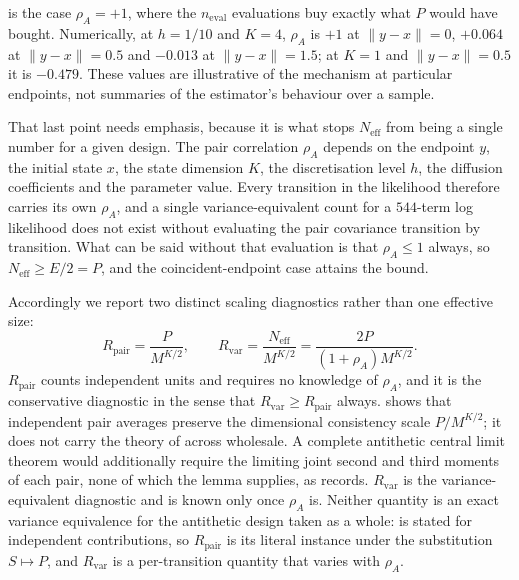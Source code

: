 \documentclass[11pt]{article}
\theoremstyle{definition}
\newcommand{\neval}{n_{\mathrm{eval}}}
\begin{document}
 is the case $\rho_A=+1$, where the $\neval$ evaluations buy exactly what $P$ would have bought. Numerically, at $h=1/10$ and $K=4$, $\rho_A$ is $+1$ at $\lVert y-x\rVert=0$, $+0.064$ at $\lVert y-x\rVert=0.5$ and $-0.013$ at $\lVert y-x\rVert=1.5$; at $K=1$ and $\lVert y-x\rVert=0.5$ it is $-0.479$. These values are illustrative of the mechanism at particular endpoints, not summaries of the estimator's behaviour over a sample.

That last point needs emphasis, because it is what stops $N_{\mathrm{eff}}$ from being a single number for a given design. The pair correlation $\rho_A$ depends on the endpoint $y$, the initial state $x$, the state dimension $K$, the discretisation level $h$, the diffusion coefficients and the parameter value. Every transition in the likelihood therefore carries its own $\rho_A$, and a single variance-equivalent count for a $544$-term log likelihood does not exist without evaluating the pair covariance transition by transition. What can be said without that evaluation is that $\rho_A\le1$ always, so $N_{\mathrm{eff}}\ge E/2=P$, and the coincident-endpoint case attains the bound.

Accordingly we report two distinct scaling diagnostics rather than one effective size:
\begin{equation}\label{eq:two_diagnostics}
R_{\mathrm{pair}}=\frac{P}{M^{K/2}},
\qquad
R_{\mathrm{var}}=\frac{N_{\mathrm{eff}}}{M^{K/2}}=\frac{2P}{(1+\rho_A)M^{K/2}} .
\end{equation}
$R_{\mathrm{pair}}$ counts independent units and requires no knowledge of $\rho_A$, and it is the conservative diagnostic in the sense that $R_{\mathrm{var}}\ge R_{\mathrm{pair}}$ always.  shows that independent pair averages preserve the dimensional consistency scale $P/M^{K/2}$; it does not carry the theory of  across wholesale. A complete antithetic central limit theorem would additionally require the limiting joint second and third moments of each pair, none of which the lemma supplies, as  records. $R_{\mathrm{var}}$ is the variance-equivalent diagnostic and is known only once $\rho_A$ is. Neither quantity is an exact variance equivalence for the antithetic design taken as a whole:  is stated for independent contributions, so $R_{\mathrm{pair}}$ is its literal instance under the substitution $S\mapsto P$, and $R_{\mathrm{var}}$ is a per-transition quantity that varies with $\rho_A$.
\end{document}
